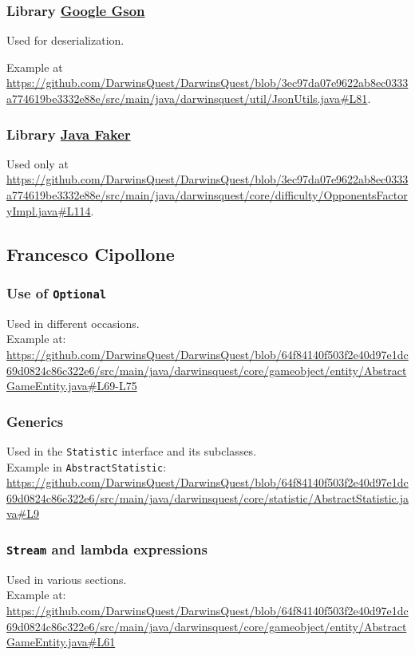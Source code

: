 \documentclass[12pt, a4paper]{report}
\theoremstyle{definition}
\begin{document}
        \subsubsection{Library \href{https://github.com/google/gson}{Google Gson}}
        
        Used for deserialization.

        Example at \url{https://github.com/DarwinsQuest/DarwinsQuest/blob/3ec97da07e9622ab8ec0333a774619be3332e88e/src/main/java/darwinsquest/util/JsonUtils.java#L81}.
        
        \subsubsection{Library \href{https://github.com/DiUS/java-faker}{Java Faker}}
        
        Used only at \url{https://github.com/DarwinsQuest/DarwinsQuest/blob/3ec97da07e9622ab8ec0333a774619be3332e88e/src/main/java/darwinsquest/core/difficulty/OpponentsFactoryImpl.java#L114}.

    \subsection*{Francesco Cipollone}

    \subsubsection{Use of \texttt{Optional}}
    Used in different occasions.\\
    Example at: \url{https://github.com/DarwinsQuest/DarwinsQuest/blob/64f84140f503f2e40d97e1dc69d0824c86c322e6/src/main/java/darwinsquest/core/gameobject/entity/AbstractGameEntity.java#L69-L75}

    \subsubsection{Generics}
    Used in the \verb|Statistic| interface and its subclasses.\\
    Example in \verb|AbstractStatistic|: \url{https://github.com/DarwinsQuest/DarwinsQuest/blob/64f84140f503f2e40d97e1dc69d0824c86c322e6/src/main/java/darwinsquest/core/statistic/AbstractStatistic.java#L9}

    \subsubsection{\texttt{Stream} and lambda expressions}
    Used in various sections.\\
    Example at: \url{https://github.com/DarwinsQuest/DarwinsQuest/blob/64f84140f503f2e40d97e1dc69d0824c86c322e6/src/main/java/darwinsquest/core/gameobject/entity/AbstractGameEntity.java#L61}
\end{document}
